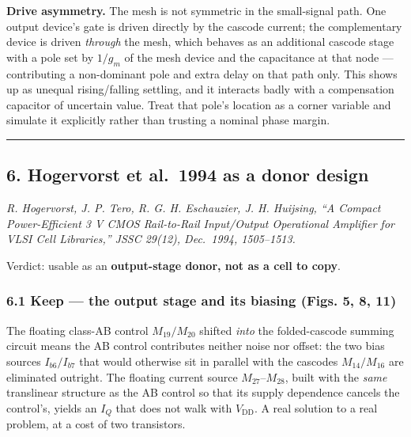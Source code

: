 \documentclass[
  10pt,
  a4paper,
]{article}
\begin{document}
\textbf{Drive asymmetry.} The mesh is not symmetric in the small-signal
path. One output device's gate is driven directly by the cascode
current; the complementary device is driven \emph{through} the mesh,
which behaves as an additional cascode stage with a pole set by
\(1/g_m\) of the mesh device and the capacitance at that node ---
contributing a non-dominant pole and extra delay on that path only. This
shows up as unequal rising/falling settling, and it interacts badly with
a compensation capacitor of uncertain value. Treat that pole's location
as a corner variable and simulate it explicitly rather than trusting a
nominal phase margin.

\begin{center}\rule{0.5\linewidth}{0.5pt}\end{center}

\hypertarget{hogervorst-et-al.-1994-as-a-donor-design}{%
\subsection{6. Hogervorst et al.~1994 as a donor
design}\label{hogervorst-et-al.-1994-as-a-donor-design}}

\emph{R. Hogervorst, J. P. Tero, R. G. H. Eschauzier, J. H. Huijsing,
``A Compact Power-Efficient 3 V CMOS Rail-to-Rail Input/Output
Operational Amplifier for VLSI Cell Libraries,'' JSSC 29(12), Dec.~1994,
1505--1513.}

Verdict: usable as an \textbf{output-stage donor, not as a cell to
copy}.

\hypertarget{keep-the-output-stage-and-its-biasing-figs.-5-8-11}{%
\subsubsection{6.1 Keep --- the output stage and its biasing (Figs. 5,
8, 11)}\label{keep-the-output-stage-and-its-biasing-figs.-5-8-11}}

The floating class-AB control \(M_{19}/M_{20}\) shifted \emph{into} the
folded-cascode summing circuit means the AB control contributes neither
noise nor offset: the two bias sources \(I_{b6}/I_{b7}\) that would
otherwise sit in parallel with the cascodes \(M_{14}/M_{16}\) are
eliminated outright. The floating current source \(M_{27}\)--\(M_{28}\),
built with the \emph{same} translinear structure as the AB control so
that its supply dependence cancels the control's, yields an \(I_Q\) that
does not walk with \(V_\mathrm{DD}\). A real solution to a real problem,
at a cost of two transistors.
\end{document}
